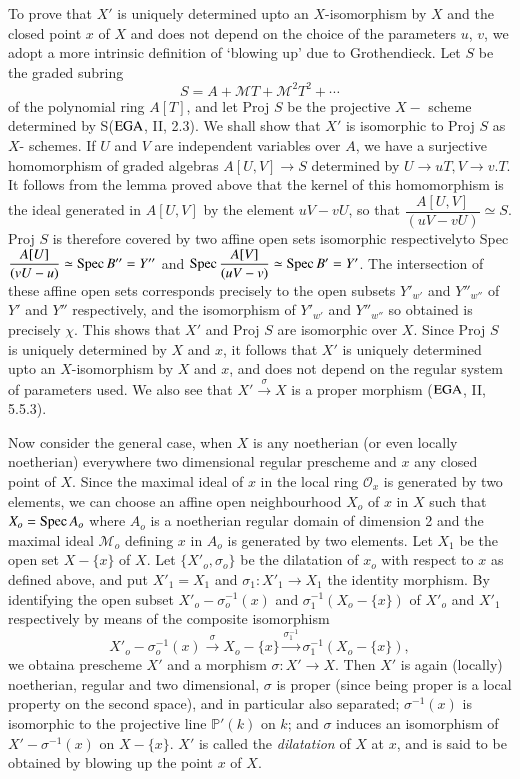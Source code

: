 To prove that $X'$ is uniquely determined upto an $X$-isomorphism by
$X$ and the closed point $x$ of $X$ and does not depend on the choice
of the parameters $u$, $v$, we adopt a more intrinsic definition of
`blowing up' due to Grothendieck. Let $S$ be the graded subring 
$$
S = A + \mathcal{M} T + \mathcal{M}^2 T^2 + \cdots
$$
of the polynomial ring $A[T]$, and let Proj $S$ be the projective $X-$
scheme determined by S($\operatorname{EGA}$, II, 2.3). We shall show that $X'$ is
isomorphic to Proj $S$ as $X$- schemes. If $U$ and $V$ are independent
variables over $A$, we have a surjective homomorphism of graded
algebras $A[U,V] \rightarrow S $ determined by $ U \rightarrow u T, V
\rightarrow v.T$. It follows from the lemma proved above that the
kernel of this homomorphism is the ideal generated in $A[U,V]$ by the
element $uV - vU$, so that $\dfrac{A[U, V]}{(uV - vU)} \simeq S$. Proj
$S$ is therefore covered by two affine open sets isomorphic
respectively\pageoriginale to Spec $\dfrac{A[U]}{(vU - u)} \simeq
\operatorname{Spec} B'' = Y''$ and $\operatorname{Spec} \dfrac{A[V]}{(uV -v)} \simeq \operatorname{Spec} B' =
Y'$. The intersection of these affine open sets corresponds precisely
to the open subsets $Y'_{w'}$ and $Y ''_{w''}$ of $Y'$ and $Y''$ 
respectively, and the isomorphism of $Y '_{w'}$ and $Y''_{w''}$ so
obtained is precisely $\chi$. This shows that $X'$ and Proj $S$ are
isomorphic over $X$. Since Proj $S$ is uniquely determined by $X$ and
$x$, it follows that $X'$ is uniquely determined upto an
$X$-isomorphism by $X$ and $x$, and does not depend on the regular
system of parameters used. We also see that
$X'\overset{\sigma}{\rightarrow} X$ is a proper morphism ($\operatorname{EGA}$, II,
5.5.3).  

Now consider the general case, when $X$ is any noetherian (or even
locally noetherian) everywhere two dimensional regular prescheme and
$x$ any closed point of $X$. Since the maximal ideal of $x$ in the
local ring $\mathscr{O}_x$ 
is generated by two elements, we can choose an affine open
neighbourhood $X_o$ of $x$ in $X$ such that $X_o = \operatorname{Spec} A_o$ where
$A_o$ is a noetherian regular domain of dimension 2 and the maximal
ideal $\mathcal{M}_o$ defining $x$ in $A_o$ is generated by two
elements. Let $X_1$ be the open set $X - \{ x \}$ of $X$. Let $\{
X'_o, \sigma_o \}$ be the dilatation of $x_o$ with respect to $x$ as 
defined above, and put $X '_1 = X_1$ and $\sigma_1 : X '_1 \rightarrow
X_1$ the identity morphism. By identifying the open subset $X'_o -
\sigma^{-1}_o (x)$ and $\sigma^{-1}_1(X_o - \{ x \})$ of $X'_o$ and
$X'_1$ respectively by means of the composite isomorphism 
$$
X'_o - \sigma^{-1}_o (x) \xrightarrow{\sigma} X_o - \{ x \} 
\xrightarrow{\sigma^{-1}_1} \sigma^{-1}_1 (X_o - \{ x \}), 
$$
we obtain\pageoriginale a prescheme $X'$ and a morphism $\sigma : X'
\rightarrow X$. Then $X'$ is again (locally) noetherian, regular and
two dimensional, $\sigma $ is proper (since being proper is a local
property on the second space), and in particular also separated;
$\sigma^{-1} (x)$ is isomorphic to the projective line $\mathbb{P'}
(k)$ on $k$; and $\sigma$ induces an isomorphism of $X' - \sigma^{-1}
(x)$ on $X - \{x\}$. $X'$ is called the \textit{dilatation} of $X$ at
$x$, and is said to be obtained by blowing up the point $x$ of $X$. 

